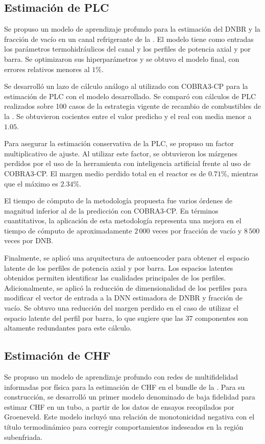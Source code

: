 \subsection{Estimación de PLC}
Se propuso un modelo de aprendizaje profundo para la estimación del DNBR y la fracción de vacío en un canal refrigerante de la \cna{}. El modelo tiene como entradas los parámetros termohidráulicos del canal y los perfiles de potencia axial y por barra. Se optimizaron sus hiperparámetros y se obtuvo el modelo final, con errores relativos menores al $1\%$. 

Se desarrolló un lazo de cálculo análogo al utilizado con COBRA3-CP para la estimación de PLC con el modelo desarrollado. Se comparó con cálculos de PLC realizados sobre 100 casos de la estrategia vigente de recambio de combustibles de la \cna{}. Se obtuvieron cocientes entre el valor predicho y el real con media menor a $1.05$. 

Para asegurar la estimación conservativa de la PLC, se propuso un factor multiplicativo de ajuste. Al utilizar este factor, se obtuvieron los márgenes perdidos por el uso de la herramienta con inteligencia artificial frente al uso de COBRA3-CP. El margen medio perdido total en el reactor es de $0.71\%$, mientras que el máximo es $2.34\%$. 

El tiempo de cómputo de la metodología propuesta fue varios órdenes de magnitud inferior al de la predicción con COBRA3-CP. En términos cuantitativos, la aplicación de esta metodología representa una mejora en el tiempo de cómputo de aproximadamente $2\,000$ veces por fracción de vacío y $8\,500$ veces por DNB.

Finalmente, se aplicó una arquitectura de autoencoder para obtener el espacio latente de los perfiles de potencia axial y por barra. Los espacios latentes obtenidos permiten identificar las cualidades principales de los perfiles. Adicionalmente, se aplicó la reducción de dimensionalidad de los perfiles para modificar el vector de entrada a la DNN estimadora de DNBR y fracción de vacío. Se obtuvo una reducción del margen perdido en el caso de utilizar el espacio latente del perfil por barra, lo que sugiere que las 37 componentes son altamente redundantes para este cálculo.


\subsection{Estimación de CHF}
Se propuso un modelo de aprendizaje profundo con redes de multifidelidad informadas por física para la estimación de CHF en el bundle de la \cna{}. Para su construcción, se desarrolló un primer modelo denominado de baja fidelidad para estimar CHF en un tubo, a partir de los datos de ensayos recopilados por Groeneveld. Este modelo incluyó una relación de monotonicidad negativa con el título termodinámico para corregir comportamientos indeseados en la región subenfriada.

